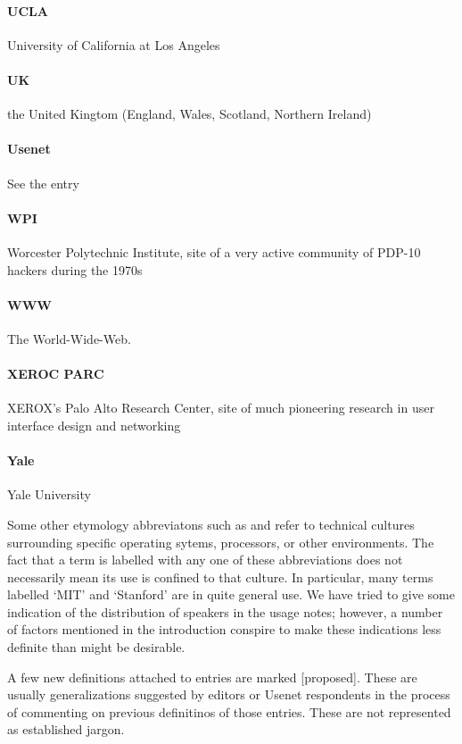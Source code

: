 \begin{multicols}{2}
	\paragraph{UCLA} University of California at Los Angeles

	\paragraph{UK} the United Kingtom (England, Wales, Scotland, Northern Ireland)

	\paragraph{Usenet} See the  entry

	\paragraph{WPI} Worcester Polytechnic Institute, site of a very active community of PDP-10 hackers during the 1970s

	\paragraph{WWW} The World-Wide-Web.

	\paragraph{XEROC PARC} XEROX's Palo Alto Research Center, site of much pioneering research in user interface design and networking

	\paragraph{Yale} Yale University
\end{multicols}

Some other etymology abbreviatons such as  and  refer  to technical cultures surrounding specific operating sytems,
processors, or other environments. The fact that a term is labelled with any one of these abbreviations does not necessarily mean its use
is confined to that culture. In particular, many terms labelled `MIT' and `Stanford' are in quite general use. We have tried to give some
indication of the distribution of speakers in the usage notes; however, a number of factors mentioned in the introduction conspire to make
these indications less definite than might be desirable.

A few new definitions attached to entries are marked [proposed]. These are usually generalizations suggested by editors or Usenet
respondents in the process of commenting on previous definitinos of those entries. These are not represented as established jargon.


